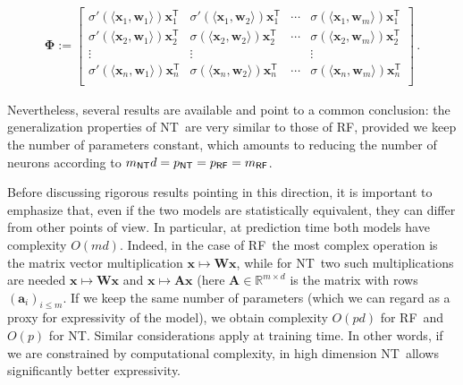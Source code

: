 \begin{align}
 \label{eq:NT-Phmatrix}
  {\boldsymbol \Phi}:=
  \left[\begin{matrix}
    \sigma'(\langle{\boldsymbol x}_1,{\boldsymbol w}_1\rangle){\boldsymbol x}_1^{{\mathsf T}} &   \sigma'(\langle{\boldsymbol x}_1,{\boldsymbol w}_2\rangle) {\boldsymbol x}_1^{{\mathsf T}} &   \cdots & \sigma(\langle{\boldsymbol x}_1,{\boldsymbol w}_m\rangle) {\boldsymbol x}_1^{{\mathsf T}} \\
    \sigma'(\langle{\boldsymbol x}_2,{\boldsymbol w}_1\rangle) {\boldsymbol x}_2^{{\mathsf T}} &   \sigma(\langle{\boldsymbol x}_2,{\boldsymbol w}_2\rangle) {\boldsymbol x}_2^{{\mathsf T}} &   \cdots & \sigma(\langle{\boldsymbol x}_2,{\boldsymbol w}_m\rangle) {\boldsymbol x}_2^{{\mathsf T}} \\
    \vdots & \vdots& & \vdots\\
    \sigma'(\langle{\boldsymbol x}_n,{\boldsymbol w}_1\rangle) {\boldsymbol x}_n^{{\mathsf T}} &   \sigma(\langle{\boldsymbol x}_n,{\boldsymbol w}_2\rangle) {\boldsymbol x}_n^{{\mathsf T}} &   \cdots & \sigma(\langle{\boldsymbol x}_n,{\boldsymbol w}_m\rangle){\boldsymbol x}_n^{{\mathsf T}}\\
  \end{matrix}\right]\, .
\end{align}

Nevertheless, several results are available and point to a common conclusion: the generalization properties of {\sf NT}\, are very similar to those of {\sf RF}, provided we keep the number of parameters constant, which amounts to reducing the number of neurons according to $m_{{\sf NT}}d= p_{{\sf NT}} = p_{{\sf RF}}= m_{{\sf RF}}$.

Before discussing rigorous results pointing in this direction, it is important to emphasize that, even if the two models are statistically equivalent, they can differ from other points of view. In particular, at prediction time both models have complexity $O(md)$. Indeed, in the case of {\sf RF}\,  the most complex operation is the matrix vector multiplication ${\boldsymbol x}\mapsto {\boldsymbol W}{\boldsymbol x}$, while for {\sf NT}\, two such multiplications are needed ${\boldsymbol x}\mapsto {\boldsymbol W}{\boldsymbol x}$ and ${\boldsymbol x}\mapsto {\boldsymbol A}{\boldsymbol x}$ (here ${\boldsymbol A}\in{\mathbb R}^{m\times d}$ is the matrix with rows $({\boldsymbol a}_i)_{i\le m}$. If we keep the same number of parameters (which we can regard as a proxy for expressivity of the model), we obtain complexity $O(pd)$ for {\sf RF}\, and $O(p)$ for {\sf NT}. Similar considerations apply at training time. In other words, if we are constrained by computational complexity, in high dimension {\sf NT}\ allows significantly better expressivity. 

